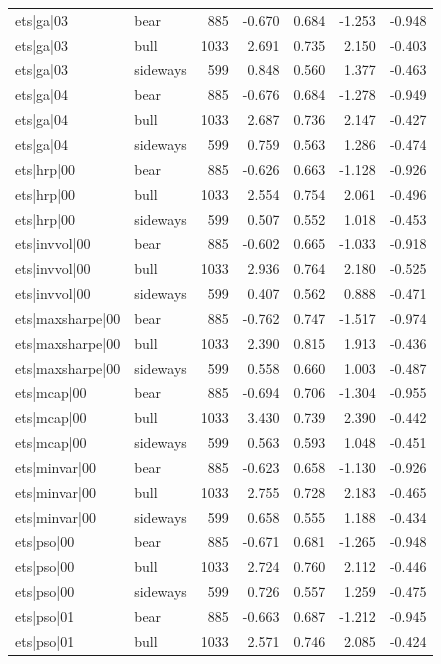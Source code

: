 \begin{table}
\begin{tabular}{llrrrrr}
ets|ga|03 & bear & 885 & -0.670 & 0.684 & -1.253 & -0.948 \\
ets|ga|03 & bull & 1033 & 2.691 & 0.735 & 2.150 & -0.403 \\
ets|ga|03 & sideways & 599 & 0.848 & 0.560 & 1.377 & -0.463 \\
ets|ga|04 & bear & 885 & -0.676 & 0.684 & -1.278 & -0.949 \\
ets|ga|04 & bull & 1033 & 2.687 & 0.736 & 2.147 & -0.427 \\
ets|ga|04 & sideways & 599 & 0.759 & 0.563 & 1.286 & -0.474 \\
ets|hrp|00 & bear & 885 & -0.626 & 0.663 & -1.128 & -0.926 \\
ets|hrp|00 & bull & 1033 & 2.554 & 0.754 & 2.061 & -0.496 \\
ets|hrp|00 & sideways & 599 & 0.507 & 0.552 & 1.018 & -0.453 \\
ets|invvol|00 & bear & 885 & -0.602 & 0.665 & -1.033 & -0.918 \\
ets|invvol|00 & bull & 1033 & 2.936 & 0.764 & 2.180 & -0.525 \\
ets|invvol|00 & sideways & 599 & 0.407 & 0.562 & 0.888 & -0.471 \\
ets|maxsharpe|00 & bear & 885 & -0.762 & 0.747 & -1.517 & -0.974 \\
ets|maxsharpe|00 & bull & 1033 & 2.390 & 0.815 & 1.913 & -0.436 \\
ets|maxsharpe|00 & sideways & 599 & 0.558 & 0.660 & 1.003 & -0.487 \\
ets|mcap|00 & bear & 885 & -0.694 & 0.706 & -1.304 & -0.955 \\
ets|mcap|00 & bull & 1033 & 3.430 & 0.739 & 2.390 & -0.442 \\
ets|mcap|00 & sideways & 599 & 0.563 & 0.593 & 1.048 & -0.451 \\
ets|minvar|00 & bear & 885 & -0.623 & 0.658 & -1.130 & -0.926 \\
ets|minvar|00 & bull & 1033 & 2.755 & 0.728 & 2.183 & -0.465 \\
ets|minvar|00 & sideways & 599 & 0.658 & 0.555 & 1.188 & -0.434 \\
ets|pso|00 & bear & 885 & -0.671 & 0.681 & -1.265 & -0.948 \\
ets|pso|00 & bull & 1033 & 2.724 & 0.760 & 2.112 & -0.446 \\
ets|pso|00 & sideways & 599 & 0.726 & 0.557 & 1.259 & -0.475 \\
ets|pso|01 & bear & 885 & -0.663 & 0.687 & -1.212 & -0.945 \\
ets|pso|01 & bull & 1033 & 2.571 & 0.746 & 2.085 & -0.424 \\

\end{tabular}
\end{table}
